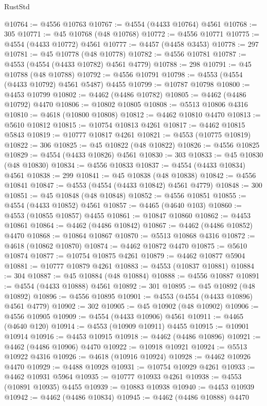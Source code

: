 \begin{lexlean}{RustStd}
\begin{coremodule}
@10764 := @4556 @10763
@10767 := @4554 (@4433 @10764) @4561
@10768 := 305
@10771 := @45 @10768 (@48 @10768)
@10772 := @4556 @10771
@10775 := @4554 (@4433 @10772) @4561
@10777 := @4457 (@4458 @3453)
@10778 := 297
@10781 := @45 @10778 (@48 @10778)
@10782 := @4556 @10781
@10787 := @4553 (@4554 (@4433 @10782) @4561 @4779)
@10788 := 298
@10791 := @45 @10788 (@48 @10788)
@10792 := @4556 @10791
@10798 := @4553 (@4554 (@4433 @10792) @4561 @5487) @4455
@10799 := @10787 @10798
@10800 := @4453 @10799
@10802 := @4462 (@4486 @10782)
@10805 := @4462 (@4486 @10792) @4470
@10806 := @10802 @10805
@10808 := @5513 @10806 @4316
@10810 := @4618 (@10800 @10808)
@10812 := @4462 @10810 @4470
@10813 := @5610 @10812
@10815 := @10754 @10813 @4261
@10817 := @4462 @10815 @5843
@10819 := @10777 @10817 @4261
@10821 := @4553 (@10775 @10819)
@10822 := 306
@10825 := @45 @10822 (@48 @10822)
@10826 := @4556 @10825
@10829 := @4554 (@4433 @10826) @4561
@10830 := 303
@10833 := @45 @10830 (@48 @10830)
@10834 := @4556 @10833
@10837 := @4554 (@4433 @10834) @4561
@10838 := 299
@10841 := @45 @10838 (@48 @10838)
@10842 := @4556 @10841
@10847 := @4553 (@4554 (@4433 @10842) @4561 @4779)
@10848 := 300
@10851 := @45 @10848 (@48 @10848)
@10852 := @4556 @10851
@10855 := @4554 (@4433 @10852) @4561
@10857 := @4465 (@4640 @103)
@10860 := @4553 (@10855 @10857) @4455
@10861 := @10847 @10860
@10862 := @4453 @10861
@10864 := @4462 (@4486 @10842)
@10867 := @4462 (@4486 @10852) @4470
@10868 := @10864 @10867
@10870 := @5513 @10868 @4316
@10872 := @4618 (@10862 @10870)
@10874 := @4462 @10872 @4470
@10875 := @5610 @10874
@10877 := @10754 @10875 @4261
@10879 := @4462 @10877 @5904
@10881 := @10777 @10879 @4261
@10883 := @4553 (@10837 @10881)
@10884 := 304
@10887 := @45 @10884 (@48 @10884)
@10888 := @4556 @10887
@10891 := @4554 (@4433 @10888) @4561
@10892 := 301
@10895 := @45 @10892 (@48 @10892)
@10896 := @4556 @10895
@10901 := @4553 (@4554 (@4433 @10896) @4561 @4779)
@10902 := 302
@10905 := @45 @10902 (@48 @10902)
@10906 := @4556 @10905
@10909 := @4554 (@4433 @10906) @4561
@10911 := @4465 (@4640 @120)
@10914 := @4553 (@10909 @10911) @4455
@10915 := @10901 @10914
@10916 := @4453 @10915
@10918 := @4462 (@4486 @10896)
@10921 := @4462 (@4486 @10906) @4470
@10922 := @10918 @10921
@10924 := @5513 @10922 @4316
@10926 := @4618 (@10916 @10924)
@10928 := @4462 @10926 @4470
@10929 := @4488 @10928
@10931 := @10754 @10929 @4261
@10933 := @4462 @10931 @5964
@10935 := @10777 @10933 @4261
@10938 := @4553 (@10891 @10935) @4455
@10939 := @10883 @10938
@10940 := @4453 @10939
@10942 := @4462 (@4486 @10834)
@10945 := @4462 (@4486 @10888) @4470

\end{coremodule}
\end{lexlean}
